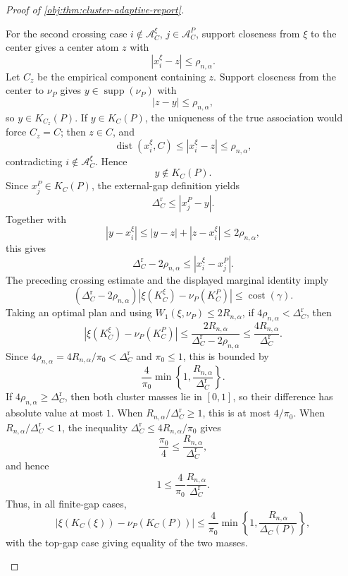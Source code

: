 \documentclass[11pt]{article}
\begin{document}
\begin{proof}[Proof of \cref{obj:thm:cluster-adaptive-report}]
\begin{enumerate}
For the second crossing case \(i\notin\mathscr A_C^\xi\),
\(j\in\mathscr A_C^P\), support closeness from \(\xi\) to the center gives a
center atom \(z\) with
\[
|x_i^\xi-z|\le\rho_{n,\alpha}.
\]
Let \(C_z\) be the empirical component containing \(z\).  Support closeness from
the center to \(\nu_P\) gives \(y\in\operatorname{supp}(\nu_P)\) with
\[
|z-y|\le\rho_{n,\alpha},
\]
so \(y\in K_{C_z}(P)\).  If \(y\in K_C(P)\), the uniqueness of the true
association would force \(C_z=C\); then \(z\in C\), and
\[
\operatorname{dist}(x_i^\xi,C)\le |x_i^\xi-z|\le\rho_{n,\alpha},
\]
contradicting \(i\notin\mathscr A_C^\xi\).  Hence
\[
y\notin K_C(P).
\]
Since \(x_j^P\in K_C(P)\), the external-gap definition yields
\[
\Delta_C^{\mathrm r}\le |x_j^P-y|.
\]
Together with
\[
|y-x_i^\xi|\le |y-z|+|z-x_i^\xi|\le2\rho_{n,\alpha},
\]
this gives
\[
\Delta_C^{\mathrm r}-2\rho_{n,\alpha}
\le |x_i^\xi-x_j^P|.
\]
The preceding crossing estimate and the displayed marginal identity imply
\[
(\Delta_C^{\mathrm r}-2\rho_{n,\alpha})
\left|\xi(K_C^\xi)-\nu_P(K_C^P)\right|
\le
\operatorname{cost}(\gamma).
\]
Taking an optimal plan and using \(W_1(\xi,\nu_P)\le2R_{n,\alpha}\), if
\(4\rho_{n,\alpha}<\Delta_C^{\mathrm r}\), then
\[
\left|\xi(K_C^\xi)-\nu_P(K_C^P)\right|
\le
\frac{2R_{n,\alpha}}{\Delta_C^{\mathrm r}-2\rho_{n,\alpha}}
\le
\frac{4R_{n,\alpha}}{\Delta_C^{\mathrm r}}.
\]
Since \(4\rho_{n,\alpha}=4R_{n,\alpha}/\pi_0<\Delta_C^{\mathrm r}\) and
\(\pi_0\le1\), this is bounded by
\[
\frac{4}{\pi_0}
\min\left\{1,\frac{R_{n,\alpha}}{\Delta_C^{\mathrm r}}\right\}.
\]
If \(4\rho_{n,\alpha}\ge\Delta_C^{\mathrm r}\), then both cluster masses lie in
\([0,1]\), so their difference has absolute value at most \(1\).  When
\(R_{n,\alpha}/\Delta_C^{\mathrm r}\ge1\), this is at most \(4/\pi_0\).  When
\(R_{n,\alpha}/\Delta_C^{\mathrm r}<1\), the inequality
\(\Delta_C^{\mathrm r}\le4R_{n,\alpha}/\pi_0\) gives
\[
\frac{\pi_0}{4}\le\frac{R_{n,\alpha}}{\Delta_C^{\mathrm r}},
\]
and hence
\[
1\le
\frac{4}{\pi_0}\frac{R_{n,\alpha}}{\Delta_C^{\mathrm r}}.
\]
Thus, in all finite-gap cases,
\[
\left|\xi(K_C(\xi))-\nu_P(K_C(P))\right|
\le
\frac{4}{\pi_0}
\min\left\{1,\frac{R_{n,\alpha}}{\Delta_C(P)}\right\},
\]
with the top-gap case giving equality of the two masses. %


\end{enumerate}
\end{proof}
\end{document}
